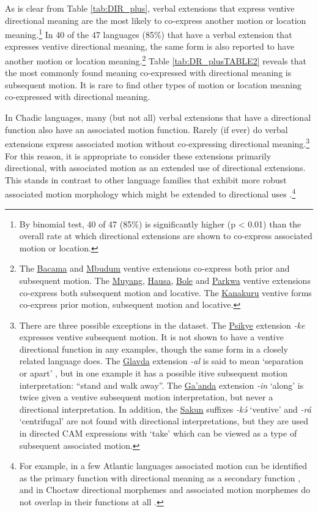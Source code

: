 As is clear from Table \ref{tab:DIR_plus}, verbal extensions that express ventive directional meaning are the most likely to co-express another motion or location meaning.\footnote{By binomial test, 40 of 47 (85\%) is significantly higher (p < 0.01) than the overall rate at which directional extensions are shown to co-express associated motion or location.} In 40 of the 47 languages (85\%) that have a verbal extension that expresses ventive directional meaning, the same form is also reported to have another motion or location meaning.\footnote{The \hyperref[baca]{Bacama} and \hyperref[mbud]{Mbudum} ventive extensions co-express both prior and subsequent motion. The \hyperref[muya]{Muyang}, \hyperref[haus]{Hausa}, \hyperref[bole]{Bole} and \hyperref[park]{Parkwa} ventive extensions co-express both subsequent motion and locative. The \hyperref[kana]{Kanakuru} ventive forms co-express prior motion, subsequent motion and locative.} Table \ref{tab:DR_plusTABLE2} reveals that the most commonly found meaning co-expressed with directional meaning is subsequent motion. It is rare to find other types of motion or location meaning co-expressed with directional meaning.

In Chadic languages, many (but not all) verbal extensions that have a directional function also have an associated motion function. Rarely (if ever) do verbal extensions express associated motion without co-expressing directional meaning.\footnote{There are three possible exceptions in the dataset. The \hyperref[psik]{Psikye} extension \textit{-ke} expresses ventive subsequent motion. It is not shown to have a ventive directional function in any examples, though the same form in a closely related language does. The \hyperref[glav]{Glavda} extension \textit{-al} is said to mean `separation or apart' \citep[25]{nghagyiyaSketchGlavdaGrammar2011}, but in one example it has a possible itive subsequent motion interpretation: ``stand and walk away''. The \hyperref[gaan]{Ga'anda} extension \textit{-in} `along' is twice given a ventive subsequent motion interpretation, but never a directional interpretation. In addition, the \hyperref[saku]{Sakun} suffixes \textit{-kə́} `ventive' and \textit{-rá} `centrifugal' are not found with directional interpretations, but they are used in directed CAM expressions with `take' which can be viewed as a type of subsequent associated motion.} For this reason, it is appropriate to consider these extensions primarily directional, with associated motion as an extended use of directional extensions. This stands in contrast to other language families that exhibit more robust associated motion morphology which might be extended to directional uses \citep{dryerAssociatedMotionDirectionals2021}.\footnote{For example, in a few Atlantic languages associated motion can be identified as the primary function with directional meaning as a secondary function \citep{voisinAssociatedMotionDeictic2021}, and in Choctaw directional morphemes and associated motion morphemes do not overlap in their functions at all \citep{broadwellChoctawDirectionalsSyntax2000}.}

